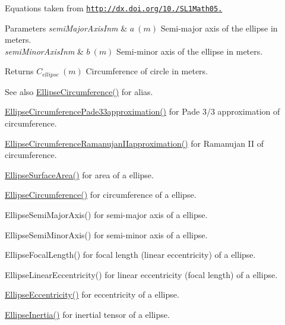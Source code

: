 Equations taken from \href{http://dx.doi.org/10.3247/SL1Math05.004}{\tt http\+://dx.\+doi.\+org/10./\+S\+L1\+Math05.} 
\begin{DoxyParams}{Parameters}
{\em semi\+Major\+Axis\+Inm} & $ a\ (m)$ Semi-\/major axis of the ellipse in meters. \\
\hline
{\em semi\+Minor\+Axis\+Inm} & $ b\ (m)$ Semi-\/minor axis of the ellipse in meters. \\
\hline
\end{DoxyParams}
\begin{DoxyReturn}{Returns}
$ C_{ellipse}\ (m)$ Circumference of circle in meters. 
\end{DoxyReturn}
\begin{DoxySeeAlso}{See also}
\mbox{\hyperlink{group___e_g_x_math-_geometry-2_d-_ellipse_ga4172802ac674eb53467b44928ac635c7}{Ellipse\+Circumference()}} for alias. 

\mbox{\hyperlink{group___e_g_x_math-_geometry-2_d-_ellipse_ga0e0b290f1da2605c16ec13b9e221769d}{Ellipse\+Circumference\+Pade33approximation()}} for Pade 3/3 approximation of circumference. 

\mbox{\hyperlink{group___e_g_x_math-_geometry-2_d-_ellipse_gaa908406db81fadc7c2d73e4e113d24d7}{Ellipse\+Circumference\+Ramanujan\+I\+Iapproximation()}} for Ramanujan II of circumference. 

\mbox{\hyperlink{group___e_g_x_math-_geometry-2_d-_ellipse_ga4ce8c8323e9718ce5458f4ab7f6d823d}{Ellipse\+Surface\+Area()}} for area of a ellipse. 

\mbox{\hyperlink{group___e_g_x_math-_geometry-2_d-_ellipse_ga4172802ac674eb53467b44928ac635c7}{Ellipse\+Circumference()}} for circumference of a ellipse. 

Ellipse\+Semi\+Major\+Axis() for semi-\/major axis of a ellipse. 

Ellipse\+Semi\+Minor\+Axis() for semi-\/minor axis of a ellipse. 

Ellipse\+Focal\+Length() for focal length (linear eccentricity) of a ellipse. 

Ellipse\+Linear\+Eccentricity() for linear eccentricity (focal length) of a ellipse. 

\mbox{\hyperlink{group___e_g_x_math-_geometry-2_d-_ellipse-_eccentricity_ga6a0a7fba17f782616894cfc447628c33}{Ellipse\+Eccentricity()}} for eccentricity of a ellipse. 

\mbox{\hyperlink{group___e_g_x_math-_geometry-2_d-_ellipse_gad679a65dc7550e27dc69c1d328c94732}{Ellipse\+Inertia()}} for inertial tensor of a ellipse. 
\end{DoxySeeAlso}
\mbox{\label{group___e_g_x_math-_geometry-2_d-_ellipse_ga4ce8c8323e9718ce5458f4ab7f6d823d}} 
